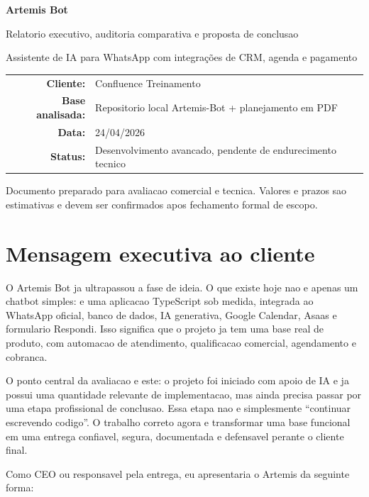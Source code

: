 \documentclass[11pt,a4paper]{article}
\begin{document}
\begin{titlepage}
  \centering
  \vspace*{2.0cm}
  {\Huge\bfseries\color{artemisBlue} Artemis Bot\par}
  \vspace{0.4cm}
  {\Large Relatorio executivo, auditoria comparativa e proposta de conclusao\par}
  \vspace{1.2cm}
  {\large Assistente de IA para WhatsApp com integrações de CRM, agenda e pagamento\par}
  \vfill
  \begin{tabular}{rl}
    \textbf{Cliente:} & Confluence Treinamento \\
    \textbf{Base analisada:} & Repositorio local Artemis-Bot + planejamento em PDF \\
    \textbf{Data:} & 24/04/2026 \\
    \textbf{Status:} & Desenvolvimento avancado, pendente de endurecimento tecnico \\
  \end{tabular}
  \vfill
  {\small Documento preparado para avaliacao comercial e tecnica. Valores e prazos sao estimativas e devem ser confirmados apos fechamento formal de escopo.}
\end{titlepage}

\tableofcontents
\newpage

\section{Mensagem executiva ao cliente}

O Artemis Bot ja ultrapassou a fase de ideia. O que existe hoje nao e apenas um chatbot simples: e uma aplicacao TypeScript sob medida, integrada ao WhatsApp oficial, banco de dados, IA generativa, Google Calendar, Asaas e formulario Respondi. Isso significa que o projeto ja tem uma base real de produto, com automacao de atendimento, qualificacao comercial, agendamento e cobranca.

O ponto central da avaliacao e este: o projeto foi iniciado com apoio de IA e ja possui uma quantidade relevante de implementacao, mas ainda precisa passar por uma etapa profissional de conclusao. Essa etapa nao e simplesmente ``continuar escrevendo codigo''. O trabalho correto agora e transformar uma base funcional em uma entrega confiavel, segura, documentada e defensavel perante o cliente final.

Como CEO ou responsavel pela entrega, eu apresentaria o Artemis da seguinte forma:
\end{document}
